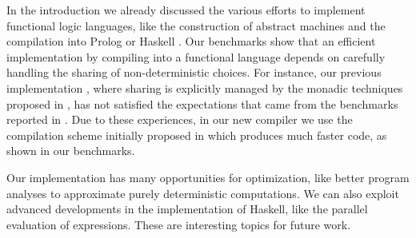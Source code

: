 \documentclass{llncs}
\begin{document}
In the introduction we already discussed the various
efforts to implement functional logic languages,
like the construction of abstract machines
\cite{AntoyHanusLiuTolmach05,HanusSadre99JFLP,Lux99FLOPS} and
the compilation into Prolog \cite{AntoyHanus00FROCOS}
or Haskell \cite{BrasselFischerHanusReck11,BrasselHuch07,BrasselHuch09}.
Our benchmarks show that an efficient implementation
by compiling into
a functional language depends on carefully handling
the sharing of non-deterministic choices. For instance, our previous
implementation \cite{BrasselFischerHanusReck11}, where sharing
is explicitly managed by the monadic techniques proposed
in \cite{FischerKiselyovShan09}, has not satisfied the expectations
that came from the benchmarks reported in \cite{FischerKiselyovShan09}.
Due to these experiences, in our new compiler we use the
compilation scheme initially proposed in \cite{BrasselFischer08IFL}
which produces much faster code, as shown in our benchmarks.

Our implementation has many opportunities for optimization, like
better program analyses to approximate purely deterministic computations.
We can also exploit advanced developments
in the implementation of Haskell, like the parallel evaluation of
expressions. These are interesting topics for future work.
\end{document}
